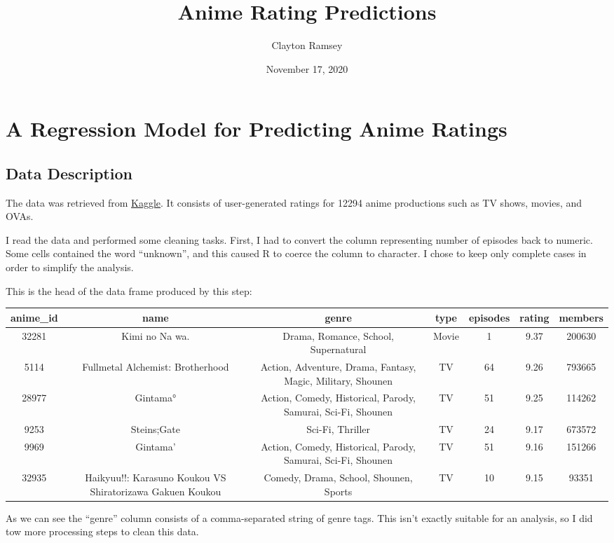 \documentclass[
]{article}
\title{Anime Rating Predictions}
\author{Clayton Ramsey}
\date{November 17, 2020}
\begin{document}
\maketitle

\hypertarget{a-regression-model-for-predicting-anime-ratings}{%
\section{A Regression Model for Predicting Anime
Ratings}\label{a-regression-model-for-predicting-anime-ratings}}

\hypertarget{data-description}{%
\subsection{Data Description}\label{data-description}}

The data was retrieved from
\href{https://www.kaggle.com/CooperUnion/anime-recommendations-database}{Kaggle}.
It consists of user-generated ratings for 12294 anime productions such
as TV shows, movies, and OVAs.

I read the data and performed some cleaning tasks. First, I had to
convert the column representing number of episodes back to numeric. Some
cells contained the word ``unknown'', and this caused R to coerce the
column to character. I chose to keep only complete cases in order to
simplify the analysis.

This is the head of the data frame produced by this step:

\begin{longtable}[]{@{}ccccccc@{}}
\toprule
anime\_id & name & genre & type & episodes & rating &
members\tabularnewline
\midrule
\endhead
32281 & Kimi no Na wa. & Drama, Romance, School, Supernatural & Movie &
1 & 9.37 & 200630\tabularnewline
5114 & Fullmetal Alchemist: Brotherhood & Action, Adventure, Drama,
Fantasy, Magic, Military, Shounen & TV & 64 & 9.26 &
793665\tabularnewline
28977 & Gintama° & Action, Comedy, Historical, Parody, Samurai, Sci-Fi,
Shounen & TV & 51 & 9.25 & 114262\tabularnewline
9253 & Steins;Gate & Sci-Fi, Thriller & TV & 24 & 9.17 &
673572\tabularnewline
9969 & Gintama' & Action, Comedy, Historical, Parody, Samurai, Sci-Fi,
Shounen & TV & 51 & 9.16 & 151266\tabularnewline
32935 & Haikyuu!!: Karasuno Koukou VS Shiratorizawa Gakuen Koukou &
Comedy, Drama, School, Shounen, Sports & TV & 10 & 9.15 &
93351\tabularnewline
\bottomrule
\end{longtable}

As we can see the ``genre'' column consists of a comma-separated string
of genre tags. This isn't exactly suitable for an analysis, so I did tow
more processing steps to clean this data.
\end{document}

